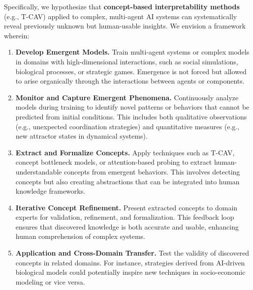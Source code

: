 \documentclass[11pt]{article}
\begin{document}
Specifically, we hypothesize that \textbf{concept-based interpretability methods} (e.g., T-CAV) applied to complex, multi-agent AI systems can systematically reveal previously unknown but human-usable insights. We envision a framework wherein:

\begin{enumerate}
    \item \textbf{Develop Emergent Models.} Train multi-agent systems or complex models in domains with high-dimensional interactions, such as social simulations, biological processes, or strategic games. Emergence is not forced but allowed to arise organically through the interactions between agents or components. 

    \item \textbf{Monitor and Capture Emergent Phenomena.} Continuously analyze models during training to identify novel patterns or behaviors that cannot be predicted from initial conditions. This includes both qualitative observations (e.g., unexpected coordination strategies) and quantitative measures (e.g., new attractor states in dynamical systems).

    \item \textbf{Extract and Formalize Concepts.} Apply techniques such as T-CAV, concept bottleneck models, or attention-based probing to extract human-understandable concepts from emergent behaviors. This involves detecting concepts but also creating abstractions that can be integrated into human knowledge frameworks.

    \item \textbf{Iterative Concept Refinement.} Present extracted concepts to domain experts for validation, refinement, and formalization. This feedback loop ensures that discovered knowledge is both accurate and usable, enhancing human comprehension of complex systems.

    \item \textbf{Application and Cross-Domain Transfer.} Test the validity of discovered concepts in related domains. For instance, strategies derived from AI-driven biological models could potentially inspire new techniques in socio-economic modeling or vice versa.
\end{enumerate}
\end{document}
